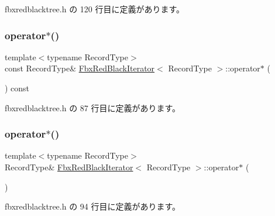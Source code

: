  fbxredblacktree.\+h の 120 行目に定義があります。

\mbox{\label{class_fbx_red_black_iterator_ae8a4c3c275647234641fb62d71f00130}} 
\subsubsection{\texorpdfstring{operator$\ast$()}{operator*()}\hspace{0.1cm}{\footnotesize\ttfamily [1/2]}}
{\footnotesize\ttfamily template$<$typename Record\+Type$>$ \\
const Record\+Type\& \hyperlink{class_fbx_red_black_iterator}{Fbx\+Red\+Black\+Iterator}$<$ Record\+Type $>$\+::operator$\ast$ (\begin{DoxyParamCaption}{ }\end{DoxyParamCaption}) const\hspace{0.3cm}{\ttfamily [inline]}}



 fbxredblacktree.\+h の 87 行目に定義があります。

\mbox{\label{class_fbx_red_black_iterator_a1f8632b341af30d1f92665e3a9206faf}} 
\subsubsection{\texorpdfstring{operator$\ast$()}{operator*()}\hspace{0.1cm}{\footnotesize\ttfamily [2/2]}}
{\footnotesize\ttfamily template$<$typename Record\+Type$>$ \\
Record\+Type\& \hyperlink{class_fbx_red_black_iterator}{Fbx\+Red\+Black\+Iterator}$<$ Record\+Type $>$\+::operator$\ast$ (\begin{DoxyParamCaption}{ }\end{DoxyParamCaption})\hspace{0.3cm}{\ttfamily [inline]}}



 fbxredblacktree.\+h の 94 行目に定義があります。

